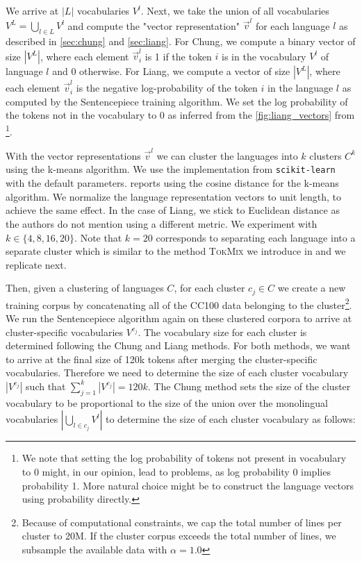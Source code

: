 We arrive at $|L|$ vocabularies $V^l$. Next, we take the union of all vocabularies $V^L = \bigcup_{l \in L} V^l$ and compute the "vector representation" $\vec{v}^l$ for each language $l$ as described in \autoref{sec:chung} and \autoref{sec:liang}. For Chung, we compute a binary vector of size $|V^L|$, where each element $\vec{v}^l_i$ is 1 if the token $i$ is in the vocabulary $V^l$ of language $l$ and 0 otherwise. For Liang, we compute a vector of size $|V^L|$, where each element $\vec{v}^l_i$ is the negative log-probability of the token $i$ in the language $l$ as computed by the Sentencepiece training algorithm. We set the log probability of the tokens not in the vocabulary to 0 as inferred from the \autoref{fig:liang_vectors} from \cite{liang_xlm-v_2023}\footnote{We note that setting the log probability of tokens not present in vocabulary to 0 might, in our opinion, lead to problems, as log probability 0 implies probability 1. More natural choice might be to construct the language vectors using probability directly.}.

With the vector representations $\vec{v}^l$ we can cluster the languages into $k$ clusters $C^k$ using the k-means algorithm. We use the implementation from \texttt{scikit-learn} \cite{pedregosa_scikit-learn_2011} with the default parameters. \citet{chung_improving_2020} reports using the cosine distance for the k-means algorithm. We normalize the language representation vectors to unit length, to achieve the same effect. In the case of Liang, we stick to Euclidean distance as the authors do not mention using a different metric. We experiment with $k \in \{4, 8, 16, 20\}$. Note that $k=20$ corresponds to separating each language into a separate cluster which is similar to the method \textsc{TokMix} we introduce in \citet{limisiewicz_tokenization_2023} and \citet{zheng_allocating_2021} we replicate next.

Then, given a clustering of languages $C$, for each cluster $c_j \in C$ we create a new training corpus by concatenating all of the CC100 data belonging to the cluster\footnote{Because of computational constraints, we cap the total number of lines per cluster to 20M. If the cluster corpus exceeds the total number of lines, we subsample the available data with $\alpha=1.0$}. We run the Sentencepiece algorithm again on these clustered corpora to arrive at cluster-specific vocabularies $V^{c_j}$. The vocabulary size for each cluster is determined following the Chung and Liang methods. For both methods, we want to arrive at the final size of 120k tokens after merging the cluster-specific vocabularies. Therefore we need to determine the size of each cluster vocabulary $|V^{c_j}|$ such that $\sum_{j=1}^k |V^{c_j}| = 120k$. The Chung method sets the size of the cluster vocabulary to be proportional to the size of the union over the monolingual vocabularies $|\bigcup_{l \in c_j} V^l|$ to determine the size of each cluster vocabulary as follows:

